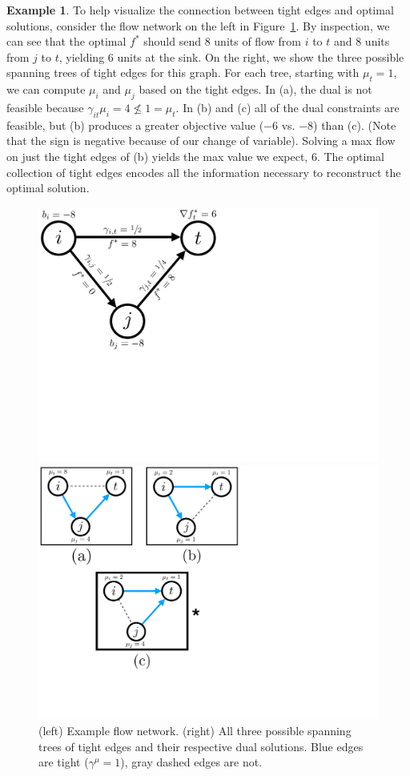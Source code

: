 \documentclass[11pt]{article}
\theoremstyle{definition}
\theoremstyle{definition}
\theoremstyle{definition}
\newtheorem{example}{Example}[section]
\begin{document}
	\begin{example}
		To help visualize the connection between tight edges and optimal solutions, 
	consider the flow network on the left in 
	Figure~\ref{fig:ex-spanning}. By inspection, we can see that the optimal $f^{*}$
	should send 8 units of flow from $i$ to $t$ and 8 units from $j$ to $t$,
	yielding 6 units at the sink. On the right, we show the three possible spanning
	trees of tight edges for this graph.
	For each tree, starting with $\mu_t = 1$, we can compute $\mu_i$
	and $\mu_j$ based on the tight edges. In (a), the dual is not feasible because
	$\gamma_{it}\mu_i = 4 \nleq 1 = \mu_t$.
	In (b) and (c) all of the dual constraints are feasible,
	but (b) produces a greater objective value ($-6$ vs. $-8$)
	than (c). (Note that the sign is negative because of our change of variable). Solving a max flow on just the tight edges of (b) yields the max value
	we expect, 6. The optimal collection of tight edges encodes all the information necessary
	to reconstruct the optimal solution.
	\begin{figure}[h]
	\centering
	\begin{minipage}{.49\textwidth}
		\centering
		\includegraphics[width=0.8\linewidth]{figs/tight}
	\end{minipage}
	\begin{minipage}{.49\textwidth}
		\centering
		\includegraphics[width=.75\linewidth]{figs/tight-span-2}
	\end{minipage}
	\label{fig:ex-spanning}
	\caption{(left) Example flow network. (right) All three possible 
	spanning trees of tight edges and their respective dual solutions.
	Blue edges are tight ($\gamma^{\mu} = 1$), gray dashed edges are not.}
	\end{figure}
	\end{example}
	
\end{document}

